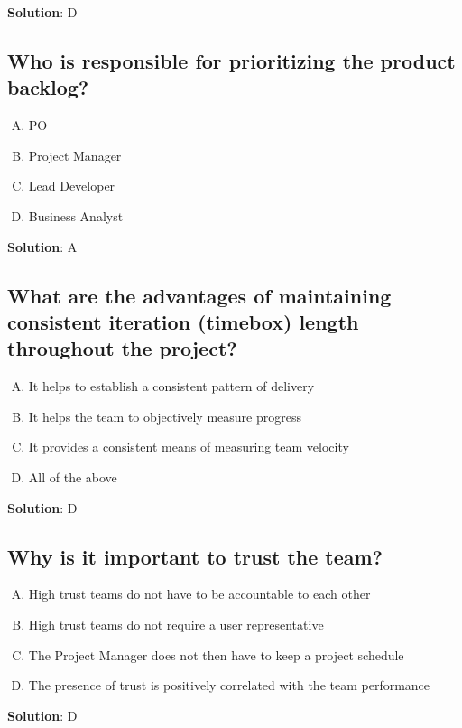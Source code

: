 \textbf{Solution}: D


\subsection{Who is responsible for prioritizing the product backlog?}
\begin{enumerate}[A)]
  \item PO
  \item Project Manager
  \item Lead Developer
  \item Business Analyst
\end{enumerate}


\textbf{Solution}: A


\subsection{What are the advantages of maintaining consistent iteration (timebox) length throughout the project?}
\begin{enumerate}[A)]
  \item It helps to establish a consistent pattern of delivery
  \item It helps the team to objectively measure progress
  \item It provides a consistent means of measuring team velocity
  \item All of the above
\end{enumerate}


\textbf{Solution}: D


\subsection{Why is it important to trust the team?}
\begin{enumerate}[A)]
  \item High trust teams do not have to be accountable to each other
  \item High trust teams do not require a user representative
  \item The Project Manager does not then have to keep a project schedule
  \item The presence of trust is positively correlated with the team performance
\end{enumerate}


\textbf{Solution}: D


